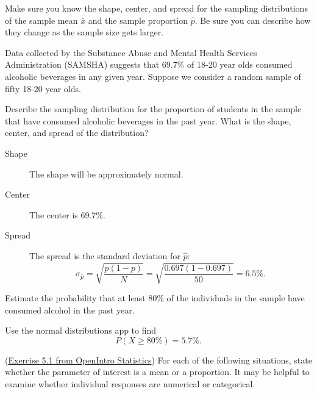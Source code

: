 \documentclass[12pt,answers]{exam}
\newcounter{countA}
\begin{document}
Make sure you know the shape, center, and spread for the sampling
distributions of the sample mean \(\bar{x}\) and the sample proportion
\(\hat{p}\). Be sure you can describe how they change as the sample size
gets larger.

\begin{questions}
\setcounter{question}{\value{countA}}

\item
  Data collected by the Substance Abuse and Mental Health Services
  Administration (SAMSHA) suggests that 69.7\% of 18-20 year olds
  consumed alcoholic beverages in any given year. Suppose we consider a
  random sample of fifty 18-20 year olds.

  \begin{parts}
  \item
    Describe the sampling distribution for the proportion of students in the sample that have
    consumed alcoholic beverages in the past year. What is the shape,
    center, and spread of the distribution?
\begin{solution}
\begin{description}
\item[Shape] The shape will be approximately normal.
\item[Center] The center is 69.7\%.
\item[Spread] The spread is the standard deviation for $\hat{p}$:
$$\sigma_{\hat{p}} = \sqrt{\frac{p(1-p)}{N}} = \sqrt{\frac{0.697(1 - 0.697)}{50}} = 6.5\%.$$
\end{description}
\end{solution}
\vfill
  \item
    Estimate the probability that at least 80\% of the individuals in
    the sample have consumed alcohol in the past year.
\begin{solution}
Use the normal distributions app to find
$$P(X \ge 80\%) = 5.7\%.$$
\end{solution}
\vfill
  \end{parts}
\item
  (\href{http://people.hsc.edu/faculty-staff/blins/books/OpenIntroStats4e.pdf\#eoce.5.1}{Exercise 5.1 from OpenIntro Statistics}) For each of the following situations, state whether the
  parameter of interest is a mean or a proportion. It may be helpful to
  examine whether individual responses are numerical or categorical.


\end{questions}
\end{document}
